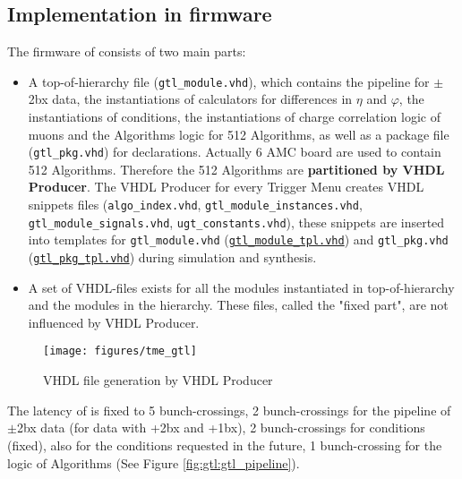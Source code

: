 \clearpage

\subsection{Implementation in firmware}
\label{sec:gtl:implementation_firmware_gtl}

The firmware of \ugtl consists of two main parts:
\begin{itemize}
\item A top-of-hierarchy file (\texttt{gtl\_module.vhd}), which contains the pipeline for $\pm$2bx data, the instantiations of calculators for differences in $\eta$ and $\varphi$, the instantiations of conditions, the instantiations of charge correlation logic of muons and the Algorithms logic for 512 Algorithms, as well as a package file (\texttt{gtl\_pkg.vhd}) for declarations.
Actually 6 AMC board are used to contain 512 Algorithms. Therefore the 512 Algorithms are \textbf{partitioned by VHDL Producer}.
The VHDL Producer for every Trigger Menu creates VHDL snippets files (\texttt{algo\_index.vhd}, \texttt{gtl\_module\_instances.vhd}, \texttt{gtl\_module\_signals.vhd}, \texttt{ugt\_constants.vhd}), these snippets are inserted into templates for \texttt{gtl\_module.vhd} (\href{https://github.com/cms-l1-globaltrigger/mp7_ugt_legacy/tree/master/firmware/hdl/payload/gtl/gtl_module_tpl.vhd}{\texttt{gtl\_module\_tpl.vhd}}) and \texttt{gtl\_pkg.vhd} (\href{https://github.com/cms-l1-globaltrigger/mp7_ugt_legacy/tree/master/firmware/hdl/packages/gtl_pkg_tpl.vhd}{\texttt{gtl\_pkg\_tpl.vhd}}) during simulation and synthesis.
\item A set of VHDL-files exists for all the modules instantiated in top-of-hierarchy and the modules in the hierarchy. These files, called the "fixed part", are not influenced by VHDL Producer.
\end{itemize}

\begin{figure}[htb]
\centering
\texttt{[image: figures/tme\_gtl]}
\caption{VHDL file generation by VHDL Producer}
\label{fig:gtl:tme_gtl}
\end{figure}

The latency of \ugtl is fixed to 5 bunch-crossings,
2 bunch-crossings for the pipeline of $\pm$2bx data (for data with +2bx and +1bx), 2 bunch-crossings for conditions (fixed), also for the conditions requested in the future, 1 bunch-crossing for the logic of Algorithms (See Figure \ref{fig:gtl:gtl_pipeline}).\\

